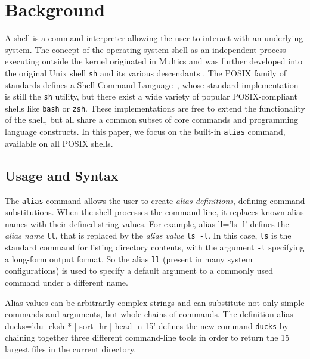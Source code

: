 \documentclass[smallextended,natbib]{svjour3}
\newenvironment{CVerbatim}
  {\center\BVerbatim}
  {\endBVerbatim\endcenter}
\newcommand{\cmd}[1]{{\texttt{#1}}}
\begin{document}
\section{Background}

A shell is a command interpreter allowing the user to interact with an underlying system.
The concept of the operating system shell as an independent process executing outside the kernel originated in Multics \citep{pouzin:65} and was further developed into the original Unix shell \texttt{sh} and its various descendants \citep{jones:11,seibold2020shell}.
The POSIX family of standards defines a Shell Command Language~\citep{posix_standard, greenberg:17}, whose standard implementation is still the \texttt{sh} utility, but there exist a wide variety of popular POSIX-compliant shells like \texttt{bash} or \texttt{zsh}.
These implementations are free to extend the functionality of the shell, but all share a common subset of core commands and programming language constructs.
In this paper, we focus on the built-in \texttt{alias} command, available on all POSIX shells.

\subsection{Usage and Syntax}

The \texttt{alias} command allows the user to create \emph{alias definitions}, defining command substitutions.
When the shell processes the command line, it replaces known alias names with their defined string values.
For example, 
\begin{CVerbatim}
alias ll='ls -l'
\end{CVerbatim}
defines the \emph{alias name} \texttt{ll}, that is replaced by the \emph{alias value} \texttt{ls -l}.
In this case, \cmd{ls} is the standard command for listing directory contents, with the argument \texttt{-l} specifying a long-form output format.
So the alias \texttt{ll} (present in many system configurations) is used to specify a default argument to a commonly used command under a different name.

Alias values can be arbitrarily complex strings and can substitute not only simple commands and arguments, but whole chains of commands. 
The definition
\begin{CVerbatim}
alias ducks='du -cksh * | sort -hr | head -n 15'
\end{CVerbatim}
defines the new command \cmd{ducks} by chaining together three different command-line tools in order to return the 15 largest files in the current directory.
\end{document}
